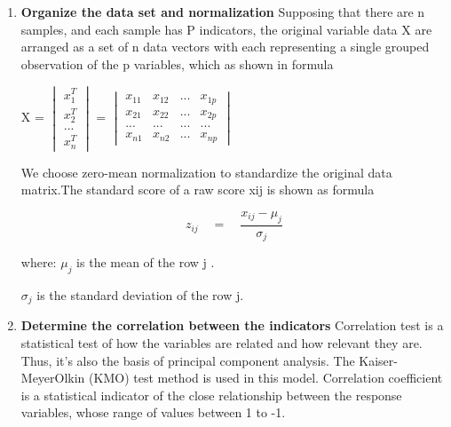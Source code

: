 \documentclass{mcmthesis}
\begin{document}
        \begin{enumerate}
          \item \textbf{Organize the data set and normalization}
          Supposing that there are n samples, and each sample has P indicators, the original variable data X are arranged as a set of n data vectors with each representing a single grouped observation of the p variables, which as shown in formula
              \begin{table}[!hbpt]
                \centering
                { X } = $\begin{vmatrix} { x }_{ 1 }^{ T } \\ { x }_{ 2 }^{ T } \\ ... \\ { x }_{ n }^{ T } \end{vmatrix}$ = $\begin{vmatrix} { { x }_{ 11 } } & { x }_{ 12 } & ... & { x }_{ 1p } \\ { x }_{ 21 } & { x }_{ 22 } & ... & { x }_{ 2p } \\ ... & ... & ... & ... \\ { x }_{ n1 } & { x }_{ n2 } & ... & { x }_{ np } \end{vmatrix}$              \end{table}

              We choose zero-mean normalization to standardize the original data matrix.The standard score of a raw score xij is shown as formula

             \begin{table}[!hbpt]
               \centering
               $${ z }_{ ij }\quad =\quad \frac { { x }_{ ij }-\mu_{j}  }{ \sigma_{j}  }$$
             \end{table}

             where:
             $\mu_{j}$ is the mean of the row j .

             $\sigma_{j}$ is the standard deviation of the row j.


          \item \textbf{Determine the correlation between the indicators}
              Correlation test is a statistical test of how the variables are related and how relevant they are. Thus, it’s also the basis of principal component analysis. The Kaiser-MeyerOlkin (KMO) test method is used in this model. Correlation coefficient is a statistical indicator of the close relationship between the response variables, whose range of values between 1 to -1.


\end{enumerate}
\end{document}
